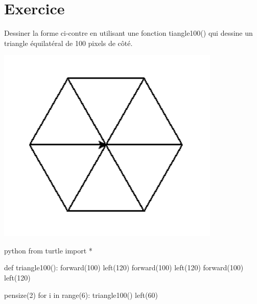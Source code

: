 \documentclass[a4paper,11pt]{article}
\begin{document}
\section{Exercice}
\begin{multicols}{2}
Dessiner la forme ci-contre en utilisant une fonction tiangle100() qui dessine un triangle équilatéral de 100 pixels de côté.
\begin{center}
\includegraphics[width=0.8\textwidth]{images/Hexagone.png}\\
\end{center}
\end{multicols}

\begin{solution}
\begin{code}{python}
from turtle import *

def triangle100():
    forward(100)
    left(120)
    forward(100)
    left(120)
    forward(100)
    left(120)

pensize(2)
for i in range(6):
    triangle100()
    left(60)
\end{code}
\end{solution}
\end{document}
